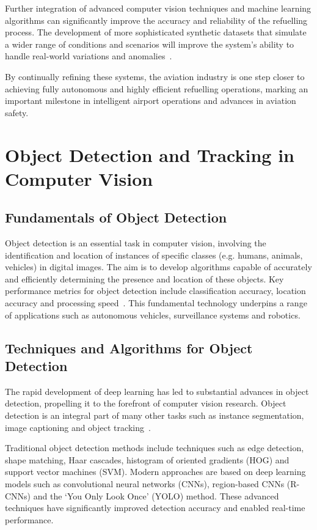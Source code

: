 \documentclass[12pt,oneside]{book} %
\begin{document}
Further integration of advanced computer vision techniques and machine learning
algorithms can significantly improve the accuracy and reliability of the
refuelling process. The development of more sophisticated synthetic datasets
that simulate a wider range of conditions and scenarios will improve the
system's ability to handle real-world variations and
anomalies~\cite{HybridDatasetAGRV2}.

By continually refining these systems, the aviation industry is one step closer
to achieving fully autonomous and highly efficient refuelling operations,
marking an important milestone in intelligent airport operations and advances
in aviation safety.

\section{Object Detection and Tracking in Computer Vision}
\subsection{Fundamentals of Object Detection}
Object detection is an essential task in computer vision, involving the
identification and location of instances of specific classes (e.g. humans,
animals, vehicles) in digital images. The aim is to develop algorithms capable
of accurately and efficiently determining the presence and location of these
objects. Key performance metrics for object detection include classification
accuracy, location accuracy and processing speed~\cite{SurveyODIn20Years}. This
fundamental technology underpins a range of applications such as autonomous
vehicles, surveillance systems and robotics.

\subsection{Techniques and Algorithms for Object Detection}
The rapid development of deep learning has led to substantial advances in
object detection, propelling it to the forefront of computer vision research.
Object detection is an integral part of many other tasks such as instance
segmentation, image captioning and object tracking~\cite{SurveyODIn20Years}.

Traditional object detection methods include techniques such as edge detection,
shape matching, Haar cascades, histogram of oriented gradients (HOG) and
support vector machines (SVM). Modern approaches are based on deep learning
models such as convolutional neural networks (CNNs), region-based CNNs (R-CNNs)
and the `You Only Look Once' (YOLO) method. These advanced techniques have
significantly improved detection accuracy and enabled real-time performance.
\end{document}
